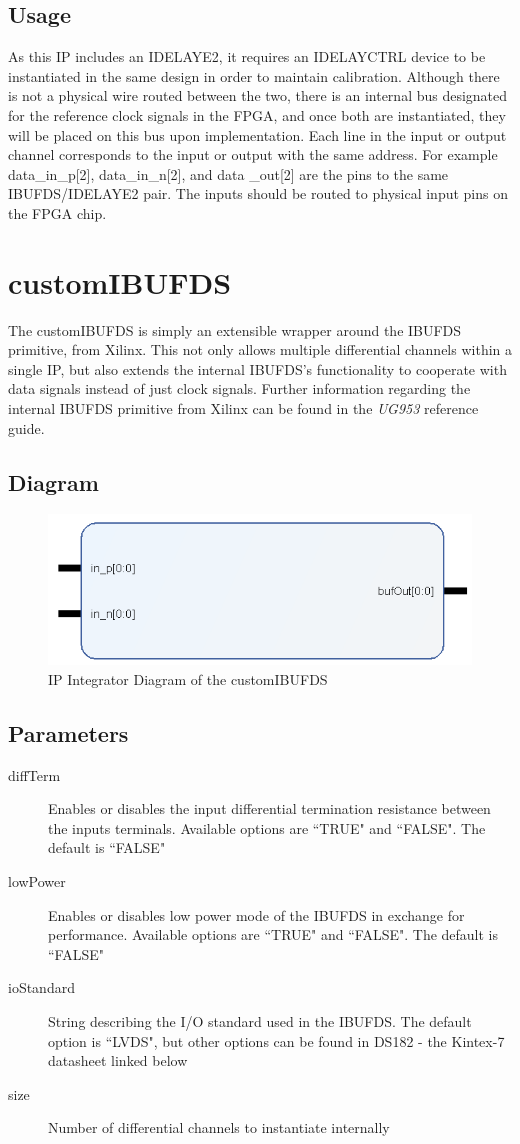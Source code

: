 \documentclass[11pt]{article}
\begin{document}
\subsection{Usage}
As this IP includes an IDELAYE2, it requires an IDELAYCTRL device to be instantiated in the same design in order to maintain calibration. Although there
is not a physical wire routed between the two, there is an internal bus designated for the reference clock signals in the FPGA, and once both are
instantiated, they will be placed on this bus upon implementation.\hfill\break
Each line in the input or output channel corresponds to the input or output with the same address. For example data\_in\_p[2], data\_in\_n[2], and data
\_out[2] are the pins to the same IBUFDS/IDELAYE2 pair.\hfill\break
The inputs should be routed to physical input pins on the FPGA chip.

\section{custom\textunderscore IBUFDS}
The custom\textunderscore IBUFDS is simply an extensible wrapper around the IBUFDS primitive, from Xilinx. This not only allows multiple differential
channels within a single IP, but also extends the internal IBUFDS's functionality to cooperate with data signals instead of just clock signals. Further
information regarding the internal IBUFDS primitive from Xilinx can be found in the \textit{UG953} reference guide.
\subsection{Diagram}
\begin{figure} [h!]
	\label{fig:custom_IBUFDS}
	\centering
	\includegraphics[width=0.6\linewidth]{images/custom_IBUFDS}
	\caption{IP Integrator Diagram of the custom\textunderscore IBUFDS}
\end{figure}
\subsection{Parameters}
\begin{description}
	\item[diffTerm]Enables or disables the input differential termination resistance between the inputs terminals. Available options are ``TRUE"
		and ``FALSE". The default is ``FALSE"
	\item[lowPower]Enables or disables low power mode of the IBUFDS in exchange for performance. Available options are ``TRUE" and ``FALSE". The default
		is ``FALSE"
	\item[ioStandard]String describing the I/O standard used in the IBUFDS. The default option is ``LVDS", but other options can be found
		in DS182 - the Kintex-7 datasheet linked below
	\item[size]Number of differential channels to instantiate internally
\end{description}
\end{document}
